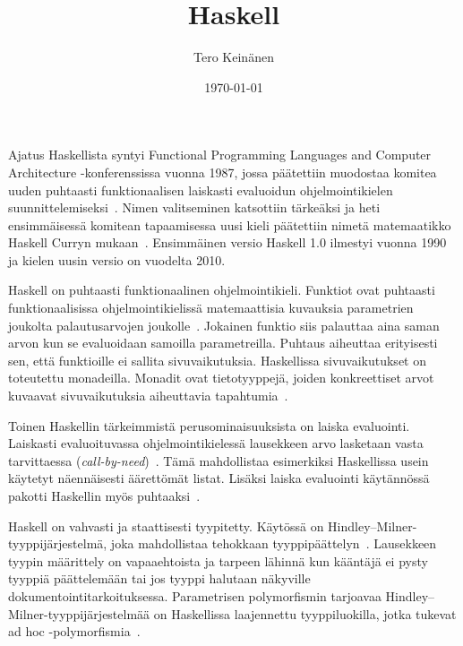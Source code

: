 \documentclass[finnish]{tktltiki2}
\title{Haskell}
\author{Tero Keinänen}
\date{\today}
\theoremstyle{definition}
\theoremstyle{remark}
\begin{document}

\frontmatter      %

\maketitle        %



\mainmatter       %


Ajatus Haskellista syntyi \foreignlanguage{english}{Functional Programming Languages and Computer Architecture} -konferenssissa vuonna 1987, jossa päätettiin muodostaa komitea uuden puhtaasti funktionaalisen laiskasti evaluoidun ohjelmointikielen suunnittelemiseksi~\cite[s.~12-1]{Hud07}. Nimen valitseminen katsottiin tärkeäksi ja heti ensimmäisessä komitean tapaamisessa uusi kieli päätettiin nimetä matemaatikko Haskell Curryn mukaan~\cite[s.~12-4]{Hud07}.  Ensimmäinen versio Haskell 1.0 ilmestyi vuonna 1990 ja kielen uusin versio on vuodelta 2010.

Haskell on puhtaasti funktionaalinen ohjelmointikieli. Funktiot ovat puhtaasti funktionaalisissa ohjelmointikielissä matemaattisia kuvauksia parametrien joukolta palautusarvojen joukolle~\cite[s.~1]{Sab98}. Jokainen funktio siis palauttaa aina saman arvon kun se evaluoidaan samoilla parametreilla. Puhtaus aiheuttaa erityisesti sen, että funktioille ei sallita sivuvaikutuksia. 
Haskellissa sivuvaikutukset on toteutettu monadeilla. Monadit ovat tietotyyppejä, joiden konkreettiset arvot kuvaavat sivuvaikutuksia aiheuttavia tapahtumia~\cite[luku~7]{Mar10}.

Toinen Haskellin tärkeimmistä perusominaisuuksista on laiska evaluointi. Laiskasti evaluoituvassa ohjelmointikielessä lausekkeen arvo lasketaan vasta tarvittaessa (\emph{call-by-need})~\cite[s.~12-8]{Hud07}. Tämä mahdollistaa esimerkiksi Haskellissa usein käytetyt näennäisesti äärettömät listat. Lisäksi laiska evaluointi käytännössä pakotti Haskellin myös puhtaaksi~\cite[s.~12-8]{Hud07}.

Haskell on vahvasti ja staattisesti tyypitetty. Käytössä on Hindley--Milner-tyyppijärjestelmä, joka mahdollistaa tehokkaan tyyppipäättelyn~\cite[luku~4.1]{Mar10}. Lausekkeen tyypin määrittely on vapaaehtoista ja tarpeen lähinnä kun kääntäjä ei pysty tyyppiä päättelemään tai jos tyyppi halutaan näkyville dokumentointitarkoituksessa. Parametrisen polymorfismin tarjoavaa Hindley--Milner-tyyppijärjestelmää on Haskellissa laajennettu tyyppiluokilla, jotka tukevat ad hoc -polymorfismia~\cite[luku~4.1]{Mar10}.
\end{document}
